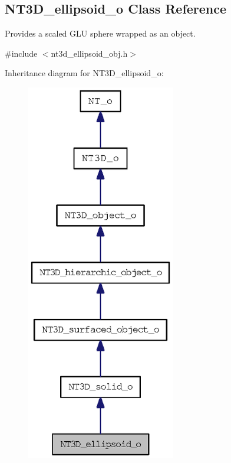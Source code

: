 \subsection{NT3D\_\-ellipsoid\_\-o Class Reference}
\label{class_n_t3_d__ellipsoid__o}


Provides a scaled GLU sphere wrapped as an object.  




{\ttfamily \#include $<$nt3d\_\-ellipsoid\_\-obj.h$>$}



Inheritance diagram for NT3D\_\-ellipsoid\_\-o:
\nopagebreak
\begin{figure}[H]
\begin{center}
\leavevmode
\includegraphics[width=184pt]{class_n_t3_d__ellipsoid__o__inherit__graph}
\end{center}
\end{figure}


